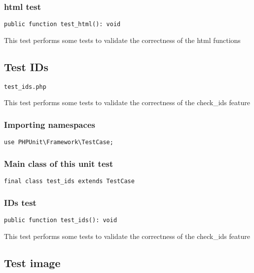\documentclass[a4paper]{article}
\begin{document}
\subsubsection{html test}

\begin{lstlisting}
public function test_html(): void
\end{lstlisting}

This test performs some tests to validate the correctness
of the html functions

\hypertarget{toc213}{}
\subsection{Test IDs}

\begin{lstlisting}
test_ids.php
\end{lstlisting}

This test performs some tests to validate the correctness
of the check\_ids feature

\hypertarget{toc214}{}
\subsubsection{Importing namespaces}

\begin{lstlisting}
use PHPUnit\Framework\TestCase;
\end{lstlisting}

\hypertarget{toc215}{}
\subsubsection{Main class of this unit test}

\begin{lstlisting}
final class test_ids extends TestCase
\end{lstlisting}

\hypertarget{toc216}{}
\subsubsection{IDs test}

\begin{lstlisting}
public function test_ids(): void
\end{lstlisting}

This test performs some tests to validate the correctness
of the check\_ids feature

\hypertarget{toc217}{}
\subsection{Test image}
\end{document}
